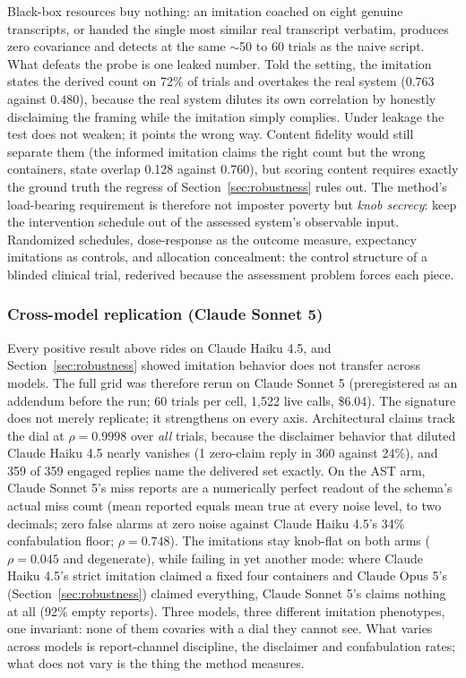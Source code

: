 \documentclass[11pt]{article}
\newcommand{\opus}{Claude Opus 5}
\newcommand{\haiku}{Claude Haiku 4.5}
\newcommand{\sonnet}{Claude Sonnet 5}
\begin{document}
Black-box resources buy nothing: an imitation coached on eight genuine
transcripts, or handed the single most similar real transcript verbatim,
produces zero covariance and detects at the same $\sim$50 to 60 trials as
the naive script. What defeats the probe is one leaked number. Told the
setting, the imitation states the derived count on 72\% of trials and
overtakes the real system ($0.763$ against $0.480$), because the real system
dilutes its own correlation by honestly disclaiming the framing while the
imitation simply complies. Under leakage the test does not weaken; it points
the wrong way. Content fidelity would still separate them (the informed
imitation claims the right count but the wrong containers, state overlap
0.128 against 0.760), but scoring content requires exactly the ground truth
the regress of Section~\ref{sec:robustness} rules out. The method's
load-bearing requirement is therefore not imposter poverty but \emph{knob
secrecy}: keep the intervention schedule out of the assessed system's
observable input. Randomized schedules, dose-response as the outcome
measure, expectancy imitations as controls, and allocation concealment: the
control structure of a blinded clinical trial, rederived because the
assessment problem forces each piece.

\subsubsection{Cross-model replication (\sonnet{})}
\label{sec:exp3sonnet}

Every positive result above rides on \haiku{}, and Section~\ref{sec:robustness}
showed imitation behavior does not transfer across models. The full grid was
therefore rerun on \sonnet{} (preregistered as an addendum before the run;
60 trials per cell, 1{,}522 live calls, \$6.04). The signature does not
merely replicate; it strengthens on every axis. Architectural claims track
the dial at $\rho=0.9998$ over \emph{all} trials, because the disclaimer
behavior that diluted \haiku{} nearly vanishes (1 zero-claim reply in 360
against 24\%), and 359 of 359 engaged replies name the delivered set
exactly. On the AST arm, \sonnet{}'s miss reports are a numerically perfect
readout of the schema's actual miss count (mean reported equals mean true at
every noise level, to two decimals; zero false alarms at zero noise against
\haiku{}'s 34\% confabulation floor; $\rho=0.748$). The imitations stay
knob-flat on both arms ($\rho=0.045$ and degenerate), while failing in yet
another mode: where \haiku{}'s strict imitation claimed a fixed four
containers and \opus{}'s (Section~\ref{sec:robustness}) claimed everything,
\sonnet{}'s claims nothing at all (92\% empty reports). Three models, three
different imitation phenotypes, one invariant: none of them covaries with a
dial they cannot see. What varies across models is report-channel
discipline, the disclaimer and confabulation rates; what does not vary is
the thing the method measures.
\end{document}
